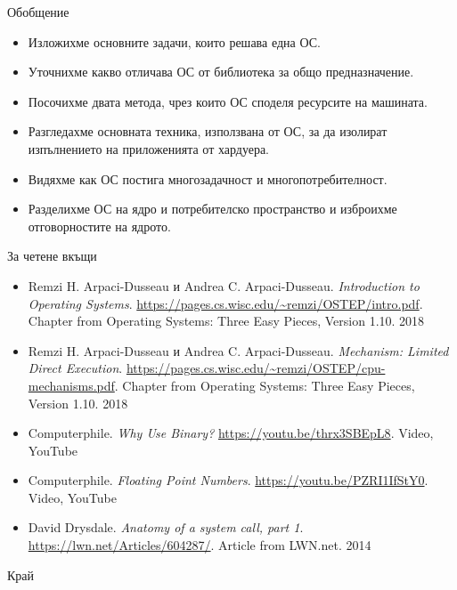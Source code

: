 \documentclass[14pt, aspectratio=169]{beamer}
\begin{document}
\begin{frame}{Обобщение}
  \begin{itemize}
    \item Изложихме основните задачи, които решава една ОС.
    \item Уточнихме какво отличава ОС от библиотека за общо предназначение.
    \item Посочихме двата метода, чрез които ОС споделя ресурсите на машината.
    \item Разгледахме основната техника, използвана от ОС, за да изолират
      изпълнението на приложенията от хардуера.
    \item Видяхме как ОС постига многозадачност и многопотребителност.
    \item Разделихме ОС на ядро и потребителско пространство и изброихме
      отговорностите на ядрото.
  \end{itemize}
\end{frame}

\begin{frame}{За четене вкъщи}
  \footnotesize
  \begin{itemize}[<1->]
    \item \textcolor{tuesnavy}{Remzi H. Arpaci-Dusseau и Andrea C. Arpaci-Dusseau}.
      \emph{Introduction to Operating Systems}.
      {\color{bibnote}\url{https://pages.cs.wisc.edu/~remzi/OSTEP/intro.pdf}.
        Chapter from Operating Systems: Three Easy Pieces, Version 1.10. 2018}
    \item \textcolor{tuesnavy}{Remzi H. Arpaci-Dusseau и Andrea C. Arpaci-Dusseau}.
      \emph{Mechanism: Limited Direct Execution}.
      {\color{bibnote}\url{https://pages.cs.wisc.edu/~remzi/OSTEP/cpu-mechanisms.pdf}.
        Chapter from Operating Systems: Three Easy Pieces, Version 1.10. 2018}
    \item \textcolor{tuesnavy}{Computerphile}. \emph{Why Use Binary?}
      {\color{bibnote}\url{https://youtu.be/thrx3SBEpL8}. Video, YouTube}
    \item \textcolor{tuesnavy}{Computerphile}. \emph{Floating Point Numbers}.
      {\color{bibnote}\url{https://youtu.be/PZRI1IfStY0}. Video, YouTube}
    \item \textcolor{tuesnavy}{David Drysdale}. \emph{Anatomy of a system call, part 1}.
      {\color{bibnote}\url{https://lwn.net/Articles/604287/}. Article from
        LWN.net. 2014}
  \end{itemize}
\end{frame}

\begin{frame}
  \Large Край
\end{frame}
\end{document}
